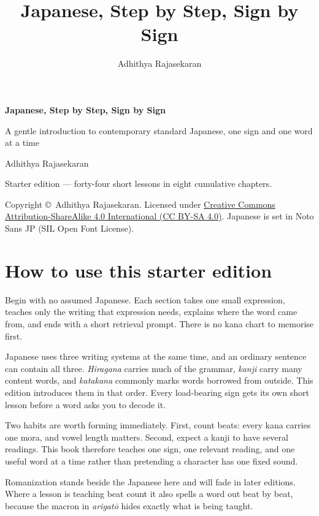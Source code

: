 \documentclass[11pt,twoside]{book}
\title{\Huge Japanese, Step by Step, Sign by Sign}
\author{Adhithya Rajasekaran}
\date{}
\begin{document}
\frontmatter

\begin{titlepage}
  \centering
  \vspace*{3cm}
  {\Huge\bfseries Japanese, Step by Step, Sign by Sign\par}
  \vspace{1cm}
  {\Large A gentle introduction to contemporary standard Japanese,
  one sign and one word at a time\par}
  \vspace{1.5cm}
  {\large Adhithya Rajasekaran\par}
  \vfill
  {\large Starter edition --- forty-four short lessons in eight cumulative chapters.\par}
  \vspace{2cm}
  {\normalsize
    Copyright \copyright\ Adhithya Rajasekaran. Licensed under
    \href{https://creativecommons.org/licenses/by-sa/4.0/}%
    {Creative Commons Attribution-ShareAlike 4.0 International (CC BY-SA 4.0)}.
    Japanese is set in Noto Sans JP (SIL Open Font License).\par
  }
\end{titlepage}

\chapter*{How to use this starter edition}

Begin with no assumed Japanese. Each section takes one small expression, teaches
only the writing that expression needs, explains where the word came from, and
ends with a short retrieval prompt. There is no kana chart to memorise first.

Japanese uses three writing systems at the same time, and an ordinary sentence
can contain all three. \emph{Hiragana} carries much of the grammar, \emph{kanji}
carry many content words, and \emph{katakana} commonly marks words borrowed from
outside. This edition introduces them in that order. Every load-bearing sign gets
its own short lesson before a word asks you to decode it.

Two habits are worth forming immediately. First, count beats: every kana carries
one mora, and vowel length matters. Second, expect a kanji to have several
readings. This book therefore teaches one sign, one relevant reading, and one
useful word at a time rather than pretending a character has one fixed sound.

Romanization stands beside the Japanese here and will fade in later editions.
Where a lesson is teaching beat count it also spells a word out beat by beat,
because the macron in \emph{arigat\=o} hides exactly what is being taught.
\end{document}
